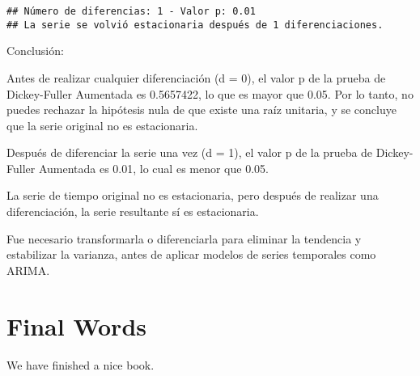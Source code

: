 \documentclass[
]{book}
\begin{document}
\begin{verbatim}
## Número de diferencias: 1 - Valor p: 0.01 
## La serie se volvió estacionaria después de 1 diferenciaciones.
\end{verbatim}

Conclusión:

Antes de realizar cualquier diferenciación (d = 0), el valor p de la prueba de Dickey-Fuller Aumentada es 0.5657422, lo que es mayor que 0.05. Por lo tanto, no puedes rechazar la hipótesis nula de que existe una raíz unitaria, y se concluye que la serie original no es estacionaria.

Después de diferenciar la serie una vez (d = 1), el valor p de la prueba de Dickey-Fuller Aumentada es 0.01, lo cual es menor que 0.05.

La serie de tiempo original no es estacionaria, pero después de realizar una diferenciación, la serie resultante sí es estacionaria.

Fue necesario transformarla o diferenciarla para eliminar la tendencia y estabilizar la varianza, antes de aplicar modelos de series temporales como ARIMA.

\hypertarget{final-words}{%
\chapter{Final Words}\label{final-words}}

We have finished a nice book.

  
\end{document}
